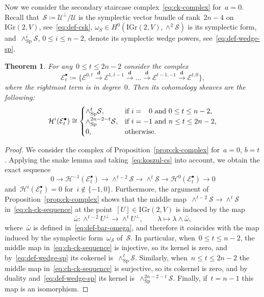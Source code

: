 \documentclass[a4paper]{article}
\newcommand{\Sp}{\mathrm{Sp}}
\newcommand{\IGr}{\mathrm{IGr}}
\newcommand{\cE}{\mathcal{E}}
\newcommand{\cH}{\mathcal{H}}
\newcommand{\cU}{\mathcal{U}}
\newcommand{\cS}{\mathcal{S}}
\newcommand{\vn}{\mathbf{d}}
\newtheorem{theorem}{Theorem}[section]
\theoremstyle{remark}
\theoremstyle{definition}
\begin{document}
Now we consider the secondary staircase complex~\eqref{eq:ck-complex} for~\(a=0\). 
Recall that~\(\cS \coloneqq \cU^\perp/\cU\) is the symplectic vector bundle of rank~\(2n - 4\) on~\(\IGr(2,V)\), see~\eqref{eq:def-csk},
\(\omega_S \in H^0(\IGr(2,V), \wedge^2\cS)\) is its symplectic form,
and~\(\wedge_\Sp^i\cS\), \(0 \le i \le n - 2\), denote its symplectic wedge powers, see~\eqref{eq:def-wedge-sp}.

\begin{theorem}
\label{thm:bicomplex}
For any~\(0 \le t \le 2n - 2\) consider the complex
\begin{equation}
\label{eq:ck-special}
\cE_t^\bullet \coloneqq
\Big\{\cE^{0,t} \xrightarrow{\ \vn\ }
\cE^{1,t-1} \xrightarrow{\ \vn\ }
\dots \xrightarrow{\ \vn\ }
\cE^{t-1,-1} \xrightarrow{\ \vn\ }
\cE^{t,0}\Big\},
\end{equation}
where the rightmost term is in degree~\(0\).
Then its cohomology sheaves are the following:
\begin{equation}
\label{eq:ch-ck}
\cH^i(\cE_t^\bullet) \cong
\begin{cases}
\wedge^t_\Sp\cS, & \text{if~\(i = \hphantom{-}0\) and~\(0 \le t \le n - 2\),}\\
\wedge^{2n-2-t}_\Sp\cS, & \text{if~\(i = -1\) and~\(n \le t \le 2n - 2\),}\\
0, & \text{otherwise}.
\end{cases}
\end{equation}
\end{theorem}

\begin{proof}
We consider the complex of Proposition~\ref{prop:ck-complex} for~\(a = 0\), \(b = t\).
Applying the snake lemma and taking~\eqref{eq:koszul-cs} into account, 
we obtain the exact sequence
\begin{equation}
\label{eq:ch-ck-sequence}
0 \to \cH^{-1}(\cE_t^\bullet) \xrightarrow{\ \quad} \wedge^{t-2}\cS \xrightarrow{\quad\ } \wedge^t\cS \xrightarrow{\ \quad} \cH^0(\cE_t^\bullet) \to 0
\end{equation} 
and~\(\cH^i(\cE_t^\bullet) = 0\) for~\(i \not\in \{-1,0\}\).
Furthermore, the argument of Proposition~\ref{prop:ck-complex} shows that 
the middle map~\(\wedge^{t-2}\cS \to \wedge^t\cS\) in~\eqref{eq:ch-ck-sequence} at the point~\([U] \in \IGr(2,V)\)
is induced by the map 
\begin{equation*}
\bar\omega \colon \wedge^{t-2}U^\perp \to \wedge^tU^\perp,
\qquad 
\lambda \mapsto \lambda \wedge \bar\omega,
\end{equation*}
where~\(\bar\omega\) is defined in~\eqref{eq:def-bar-omega},
and therefore it coincides with the map induced by the symplectic form~\(\omega_\cS\) of~\(\cS\).
In particular, when~\(0 \le t \le n - 2\), the middle map in~\eqref{eq:ch-ck-sequence} is injective,
so its kernel is zero, and by~\eqref{eq:def-wedge-sp} its cokernel is~\(\wedge^t_\Sp\cS\).
Similarly, when~\(n \le t \le 2n - 2\) the middle map in~\eqref{eq:ch-ck-sequence} is surjective,
so its cokernel is zero, and by duality and~\eqref{eq:def-wedge-sp} its kernel is~\(\wedge^{2n-2-t}_\Sp\cS\).
Finally, if~\(t = n - 1\) this map is an isomorphism.
\end{proof}
\end{document}
